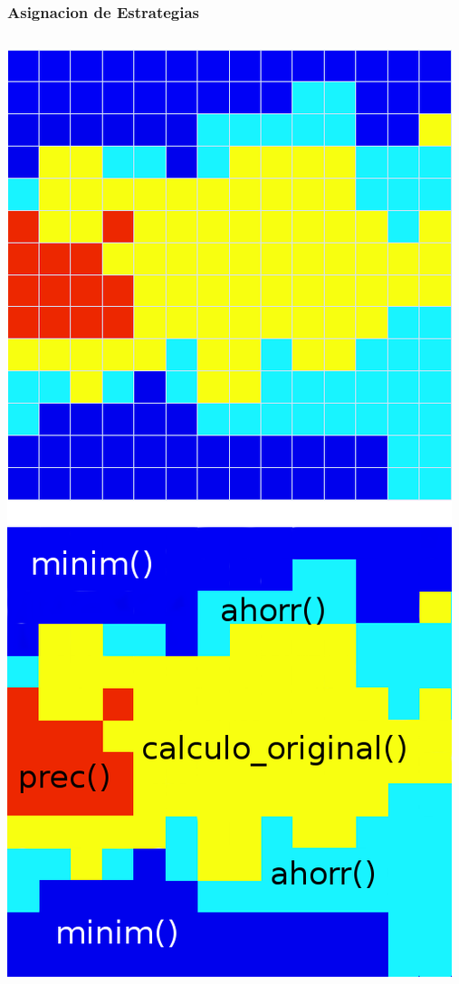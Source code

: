 \documentclass{beamer}\usetheme{Madrid} %
\begin{document}
\begin{frame}[fragile]
\frametitle{Asignacion de Estrategias}
\begin{columns}
\begin{center}
\includegraphics[scale=0.2]{img/asignacion_codigo.png}

\end{center}
\end{columns}
\end{frame}
\end{document}
